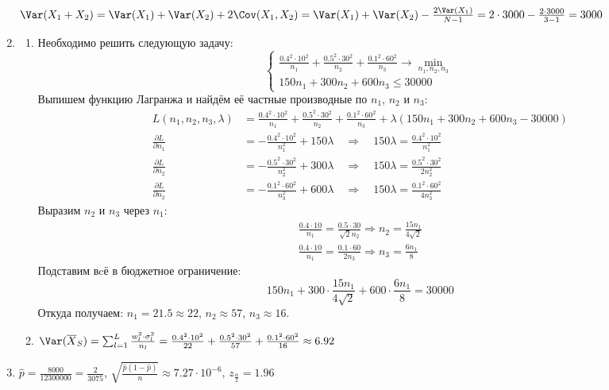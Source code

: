 \begin{enumerate}
$\Var(X_1+X_2) = \Var(X_1) + \Var(X_2) + 2\Cov(X_1, X_2) = \Var(X_1) + \Var(X_2) - \frac{2\Var(X_1)}{N-1} = 2 \cdot 3000 - \frac{2\cdot3000}{3-1} = 3000$
\item
\begin{enumerate}
\item Необходимо решить следующую задачу:
\[
\begin{cases}
\frac{0.4^2 \cdot 10^2}{n_1} + \frac{0.5^2 \cdot 30^2}{n_2} + \frac{0.1^2 \cdot 60^2}{n_3} \to \min_{n_1, n_2, n_3} \\
150 n_1 + 300 n_2 + 600 n_3 \leq 30000
\end{cases}
\]
Выпишем функцию Лагранжа и найдём её частные производные по $n_1$, $n_2$ и $n_3$:
\begin{align*}
L(n_1, n_2, n_3, \lambda) &= \frac{0.4^2 \cdot 10^2}{n_1} + \frac{0.5^2 \cdot 30^2}{n_2} + \frac{0.1^2 \cdot 60^2}{n_3} + \lambda (150 n_1 + 300 n_2 + 600 n_3 - 30000) \\
\frac{\partial L}{\partial n_1} &= -\frac{0.4^2 \cdot 10^2}{n_1^2} + 150 \lambda \quad \Rightarrow \quad 150 \lambda = \frac{0.4^2 \cdot 10^2}{n_1^2} \\
\frac{\partial L}{\partial n_2} &= -\frac{0.5^2 \cdot 30^2}{n_2^2} + 300 \lambda \quad \Rightarrow \quad 150 \lambda = \frac{0.5^2 \cdot 30^2}{2n_2^2} \\
\frac{\partial L}{\partial n_2} &= -\frac{0.1^2 \cdot 60^2}{n_3^2} + 600 \lambda \quad \Rightarrow \quad 150 \lambda = \frac{0.1^2 \cdot 60^2}{4n_3^2}
\end{align*}
Выразим $n_2$ и $n_3$ через $n_1$:
\begin{align*}
\frac{0.4 \cdot 10}{n_1} = \frac{0.5 \cdot 30}{\sqrt{2}n_2} \Rightarrow n_2 = \frac{15n_1}{4\sqrt{2}} \\
\frac{0.4 \cdot 10}{n_1} = \frac{0.1 \cdot 60}{2n_3} \Rightarrow n_3 = \frac{6n_1}{8}
\end{align*}
Подставим вcё в бюджетное ограничение:
\[
150 n_1 + 300 \cdot \frac{15n_1}{4\sqrt{2}} + 600 \cdot \frac{6n_1}{8} = 30000
\]
Откуда получаем: $n_1 = 21.5 \approx 22$, $n_2 \approx 57$, $n_3 \approx 16$.
\item $
\Var(\overline{X}_S) = \sum_{l=1}^L \frac{w_l^2 \cdot \sigma_l^2}{n_l}
= \frac{0.4^2 \cdot 10^2}{22} + \frac{0.5^2 \cdot 30^2}{57} + \frac{0.1^2 \cdot 60^2}{16}
\approx 6.92$
\end{enumerate}
\item $\hat{p} = \frac{8000}{12300000} = \frac{2}{3075}$, $\sqrt{\frac{\hat{p}(1-\hat{p})}{n}} \approx 7.27 \cdot 10^{-6}$, $z_{\frac{\alpha}{2}} = 1.96$


\end{enumerate}
